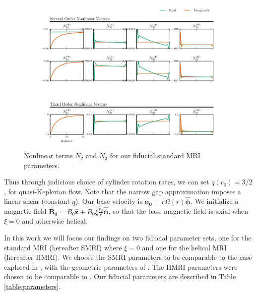 \documentclass{emulateapj}
\newcommand{\citei}[1]{\citeauthor{#1} \citeyear{#1}}
\newcommand{\phihat}{\ensuremath{\mathbf{\hat{\phi}}}}
\newcommand{\zhat}{\ensuremath{\mathbf{\hat{z}}}}
\begin{document}
\begin{figure}
\centering
\includegraphics[width=\textwidth]{../python/widegap/figures/nonlinear_2_3_widegap_fiducial_eigenfunctions.pdf}
\caption{Nonlinear terms $N_2$ and $N_3$ for our fiducial standard MRI parameters.}\label{fig:N2_N3}
\end{figure}

Thus through judicious choice of cylinder rotation rates, we can set $q(r_0) = 3/2$, for quasi-Keplerian flow. Note that the narrow gap approximation imposes a linear shear (constant $q$). Our base velocity is $\mathbf{u_0} = r\Omega(r) \phihat$. We initialize a magnetic field $\mathbf{B_0} = B_0 \zhat + B_0 \xi \frac{r_0}{r} \phihat$, so that the base magnetic field is axial when $\xi = 0$ and otherwise helical. 

In this work we will focus our findings on two fiducial parameter sets, one for the standard MRI (hereafter SMRI) where $\xi = 0$ and one for the helical MRI (hereafter HMRI). We choose the SMRI parameters to be comparable to the case explored in \citei{Umurhan:2007hs}, with the geometric parameters of \citei{Goodman:2002ix}. The HMRI parameters were chosen to be comparable to \citei{Hollerbach:2005tr}. Our fiducial parameters are described in Table \ref{table:parameters}.
\end{document}
